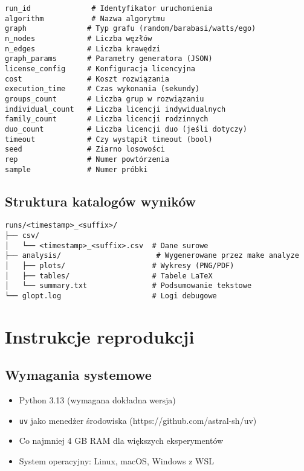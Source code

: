 \begin{verbatim}
run_id              # Identyfikator uruchomienia
algorithm           # Nazwa algorytmu
graph              # Typ grafu (random/barabasi/watts/ego)
n_nodes            # Liczba węzłów
n_edges            # Liczba krawędzi
graph_params       # Parametry generatora (JSON)
license_config     # Konfiguracja licencyjna
cost               # Koszt rozwiązania
execution_time     # Czas wykonania (sekundy)
groups_count       # Liczba grup w rozwiązaniu
individual_count   # Liczba licencji indywidualnych
family_count       # Liczba licencji rodzinnych
duo_count          # Liczba licencji duo (jeśli dotyczy)
timeout            # Czy wystąpił timeout (bool)
seed               # Ziarno losowości
rep                # Numer powtórzenia
sample             # Numer próbki
\end{verbatim}

\subsection{Struktura katalogów wyników}

\begin{verbatim}
runs/<timestamp>_<suffix>/
├── csv/
│   └── <timestamp>_<suffix>.csv  # Dane surowe
├── analysis/                      # Wygenerowane przez make analyze
│   ├── plots/                    # Wykresy (PNG/PDF)
│   ├── tables/                   # Tabele LaTeX
│   └── summary.txt               # Podsumowanie tekstowe
└── glopt.log                     # Logi debugowe
\end{verbatim}

\section{Instrukcje reprodukcji}

\subsection{Wymagania systemowe}

\begin{itemize}
\item Python 3.13 (wymagana dokładna wersja)
\item \texttt{uv} jako menedżer środowiska (https://github.com/astral-sh/uv)
\item Co najmniej 4 GB RAM dla większych eksperymentów
\item System operacyjny: Linux, macOS, Windows z WSL
\end{itemize}

